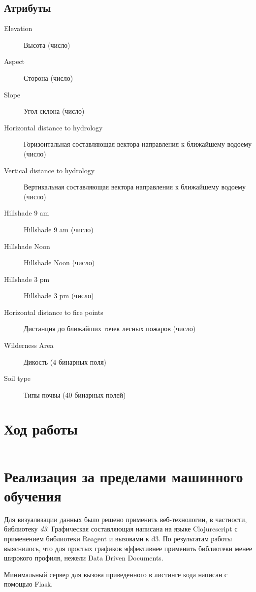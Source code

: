 \documentclass[12pt, a4paper] {article}
\begin{document}
\subsection{Атрибуты}
\begin{description}
  \item[Elevation] Высота (число)
  \item[Aspect] Сторона (число)
  \item[Slope] Угол склона (число)
  \item[Horizontal distance to hydrology] Горизонтальная составляющая вектора направления к ближайшему водоему (число)
  \item[Vertical distance to hydrology] Вертикальная составляющая вектора направления к ближайшему водоему (число)
  \item[Hillshade 9 am] Hillshade 9 am (число)
  \item[Hillshade Noon] Hillshade Noon (число)
  \item[Hillshade 3 pm] Hillshade 3 pm (число)
  \item[Horizontal distance to fire points] Дистанция до ближайших точек лесных пожаров (число)
  \item[Wilderness Area] Дикость (4 бинарных поля)
  \item[Soil type] Типы почвы (40 бинарных полей)
\end{description}

\section{Ход работы}
\inputminted{python}{listing.py}

\section{Реализация за пределами машинного обучения}
Для визуализации данных было решено применить веб-технологии, в частности,
библиотеку \textit{d3}. Графическая составляющая написана на языке Clojurescript
с применением библиотеки Reagent и вызовами к d3. По результатам работы выяснилось,
что для простых графиков эффективнее применить библиотеки менее широкого профиля,
нежели Data Driven Documents.

Минимальный сервер для вызова приведенного в листинге кода написан с помощью
Flask.
\end{document}
